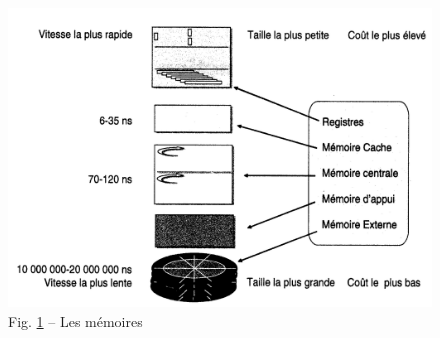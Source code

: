 \documentclass[11pt,french]{article}
\makeatletter
\def\maxwidth{\ifdim\Gin@nat@width>\linewidth\linewidth
    \else\Gin@nat@width\fi}
\let\Oldincludegraphics\includegraphics
\renewcommand{\includegraphics}[1]{\Oldincludegraphics[width=.8\maxwidth]{#1}}
\makeatother
\begin{document}
\begin{figure}[h!]
	\begin{center}
		\includegraphics{../img/DiU001.png}
	\end{center}
	\caption{Fig. \ref{fig:memoires} -- Les mémoires}
	\label{fig:memoires}
\end{figure}
\end{document}
